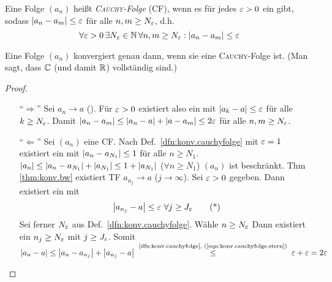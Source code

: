 \documentclass[12pt]{scrreprt}
\begin{document}
\begin{dfn}
  \label{dfn:konv.cauchyfolge}
  Eine Folge $(a_n)$ heißt \emph{\textsc{Cauchy}-Folge} (CF), wenn es für jedes
  $\varepsilon>0$ ein  gibt, sodass $\left\lvert a_n-a_m\right\lvert\le\varepsilon$ für alle
  $n, m \ge N_\varepsilon$, d.h.
  \[\forall \varepsilon>0\, \exists N_\varepsilon\in\mathbb{N}\, \forall n, m \ge N_\varepsilon: \left\lvert a_n-a_m\right\lvert\le\varepsilon\]
\end{dfn}

\begin{thm}
  \label{thm:konv.cauchyfolge}
  Eine Folge $(a_n)$ konvergiert genau dann, wenn sie eine
  \textsc{Cauchy}-Folge ist. (Man sagt, dass $\mathbb{C}$ (und damit $\mathbb{R}$)
  vollständig sind.)
\end{thm}
\begin{proof}
  \begin{enumerate}
  \item["`$\Rightarrow$"'] Sei $a_n\to a$ (\ninf). Für $\varepsilon>0$
    existiert also ein  mit $\left\lvert a_k-a\right\lvert\le\varepsilon$ für alle
    $k\ge N_\varepsilon$. Damit $\left\lvert a_n-a_m\right\lvert \le \left\lvert a_n-a\right\lvert+\left\lvert a-a_m\right\lvert \le
    2\varepsilon$ für alle $n, m \ge N_\varepsilon$.
  \item["`$\Leftarrow$"'] Sei $(a_n)$ eine CF. Nach
    Def.~\ref{dfn:konv.cauchyfolge} mit $\varepsilon=1$ existiert ein
     mit $\left\lvert a_n-a_{N_1}\right\lvert\le1$ für alle $n\ge N_1$. \folgt
    $\left\lvert a_n\right\lvert \le \left\lvert a_n-a_{N_1}\right\lvert+\left\lvert a_{N_1}\right\lvert \le
    1+\left\lvert a_{N_1}\right\lvert$ ($\forall n\ge N_1$) \folgt $(a_n)$ ist
    beschränkt. Thm \ref{thm:konv.bw} \folgt existiert TF $a_{n_j}\to
    a$ ($j\to\infty$). Sei $\varepsilon>0$ gegeben. Dann existiert ein
     mit
    \begin{equation} \label{eqn:konv.cauchyfolge.stern}
      \left\lvert a_{n_j}-a\right\lvert \le \varepsilon \ \forall j \ge J_\varepsilon \tag{*}
    \end{equation}
    Sei ferner $N_\varepsilon$ aus Def.~\ref{dfn:konv.cauchyfolge}. Wähle
    $n\ge N_\varepsilon$ Dann existiert ein $n_j\ge N_\varepsilon$ mit $j\ge
    J_\varepsilon$. Somit $\abs{a_n-a} \le \abs{a_n-a_{n_j}}+\abs{a_{n_j}-a}
    \nach{\le}{\ref{dfn:konv.cauchyfolge}, (\ref{eqn:konv.cauchyfolge.stern})} \ep+\ep = 2\ep$
  \end{enumerate}
\end{proof}
\end{document}
